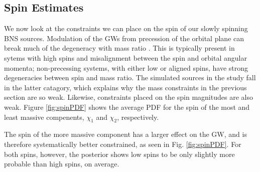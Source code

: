 \subsection{Spin Estimates}\label{sec:spin-magnitudes}

We now look at the constraints we can place on the spin of our slowly spinning BNS sources.  Modulation of the GWs from precession of the orbital plane can break much of the degeneracy with mass ratio \citep{Vecchio_2004,Lang_2006,Vitale_2014,Chatziioannou_2014}. This is typically present in sytems with high spins and misalignment between the spin and orbital angular momenta; non-precessing systems, with either low or aligned spins, have strong degeneracies between spin and mass ratio.  The simulated sources in the study fall in the latter catagory, which explains why the mass constraints in the previous section are so weak.  Likewise, constraints placed on the spin magnitudes are also weak.  Figure \ref{fig:spinPDF} shows the average PDF for the spin of the most and least massive compenents, $\chi_1$ and $\chi_2$, respectively.

The spin of the more massive component has a larger effect on the GW, and is therefore systematically better constrained, as seen in Fig. \ref{fig:spinPDF}.  For both spins, however, the posterior shows low spins to be only slightly more probable than high spins, on average.
  